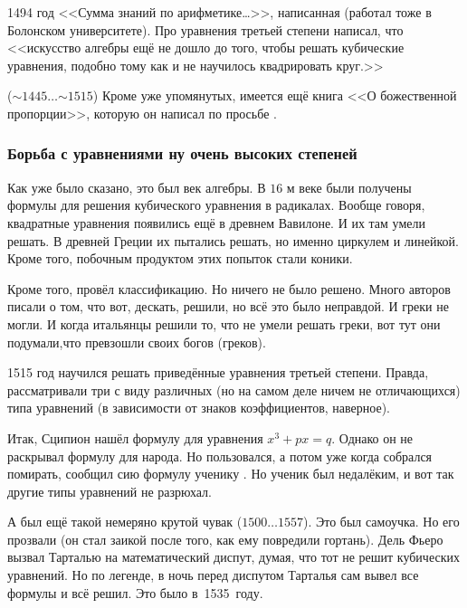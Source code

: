 \documentclass[a4paper,oneside,fleqn,10pt]{article}
\newcommand{\pe}[2]{${#1}\ldots{#2}$}
\begin{document}
1494 год <<Сумма знаний по арифметике\ldots>>, написанная  (работал тоже в Болонском университете). Про
уравнения третьей степени написал, что <<искусство алгебры ещё не
дошло до того, чтобы решать кубические уравнения, подобно тому как и
не научилось квадрировать круг.>>

 (\pe{{\sim}1445}{{\sim}1515})
Кроме уже упомянутых, имеется ещё книга <<О божественной пропорции>>,
которую он написал по просьбе .

\subsubsection{Борьба с уравнениями ну очень высоких степеней}

Как уже было сказано, это был век алгебры. В $16$ м веке были получены
формулы для решения кубического уравнения в радикалах. Вообще говоря,
квадратные уравнения появились ещё в древнем Вавилоне. И их там умели
решать. В древней Греции их пытались решать, но именно циркулем и
линейкой. Кроме того, побочным продуктом этих попыток стали коники.

Кроме того,  провёл классификацию. Но ничего
не было решено. Много авторов писали о том, что вот, дескать, решили,
но всё это было неправдой. И греки не могли.  И когда итальянцы решили
то, что не умели решать греки, вот тут они подумали,что превзошли
своих богов (греков).

1515 год  научился решать приведённые
уравнения третьей степени.  Правда, рассматривали три с виду различных
(но на самом деле ничем не отличающихся) типа уравнений (в зависимости
от знаков коэффициентов, наверное).

Итак, Сципион нашёл формулу для уравнения $x^3 + px = q$. Однако он не
раскрывал формулу для народа.  Но пользовался, а потом уже когда
собрался помирать, сообщил сию формулу ученику .  Но
ученик был недалёким, и вот так другие типы уравнений не разрюхал.

А был ещё такой немеряно крутой чувак 
(\pe{1500}{1557}). Это был самоучка.  Но его прозвали 
(он стал заикой после того, как ему повредили гортань).  Дель Фьеро
вызвал Тарталью на математический диспут, думая, что тот не решит
кубических уравнений.  Но по легенде, в ночь перед диспутом Тарталья
сам вывел все формулы и всё решил.  Это было в~1535~году.
\end{document}

